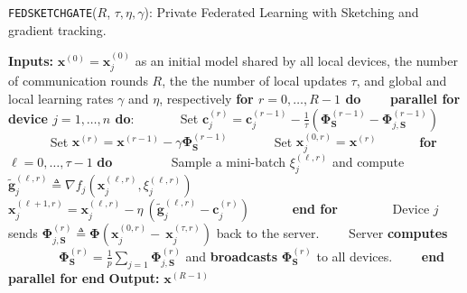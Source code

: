 \begin{algorithm}[H]
\caption{\texttt{FEDSKETCHGATE}($R$, $\tau, \eta, \gamma$): Private Federated Learning with Sketching and gradient tracking. }\label{Alg:PFLHet}
\begin{algorithmic}[1]
\State \textbf{Inputs:} $\boldsymbol{x}^{(0)}=\boldsymbol{x}^{(0)}_j$ as an initial  model shared by all local devices, the number of communication rounds $R$, the the number of local updates $\tau$, and global and local learning rates $\gamma$ and $\eta$, respectively
\State \textbf{for $r=0, \ldots, R-1$ do}
\State $\qquad$\textbf{parallel for device $j=1,\ldots,n$ do}:
\State $\qquad\quad$ Set $\mathbf{c}_j^{(r)}=\mathbf{c}_j^{(r-1)}-\frac{1}{\tau}\left(\mathbf{\Phi}_{\mathbf{S}}^{(r-1)}-\mathbf{\Phi}^{(r-1)}_{j,\mathbf{S}}\right)$
\State $\qquad\quad$ Set $\boldsymbol{x}^{(r)}=\boldsymbol{x}^{(r-1)}-\gamma{\mathbf{\Phi}}_{\mathbf{S}}^{(r-1)}$
\State $\qquad\quad$ Set $\boldsymbol{x}_j^{(0,r)}=\boldsymbol{x}^{(r)}$ %
\State $\qquad\quad $\textbf{for} $\ell=0,\ldots,\tau-1$ \textbf{do}
\State $\qquad\quad\quad$ Sample a mini-batch $\xi_j^{(\ell,r)}$ and compute $\tilde{\mathbf{g}}_{j}^{(\ell,r)}\triangleq\nabla{f}_j(\boldsymbol{x}^{(\ell,r)}_j,\xi_j^{(\ell,r)})$
\State $\qquad\quad\quad$ $\boldsymbol{x}^{(\ell+1,r)}_{j}=\boldsymbol{x}^{(\ell,r)}_j-\eta~\left( \tilde{\mathbf{g}}_{j}^{(\ell,r)}-\mathbf{c}_j^{(r)}\right)$ \label{eq:update-rule-alg}
\State $\qquad\quad$\textbf{end for}
\State $\qquad\quad\quad$Device $j$ sends $\mathbf{\Phi}^{(r)}_{j,\mathbf{S}}\triangleq\mathbf{\Phi}\left(\boldsymbol{x}_j^{(0,r)}-~{\boldsymbol{x}}_{j}^{(\tau,r)}\right)$ back to the server.
\State $\qquad$Server \textbf{computes} 
\State $\qquad\qquad {\mathbf{\Phi}}_{\mathbf{S}}^{(r)}=\frac{1}{p}\sum_{j=1}\mathbf{\Phi}^{(r)}_{j,\mathbf{S}}$ and  \textbf{broadcasts} ${\mathbf{\Phi}}_{\mathbf{S}}^{(r)}$ to all devices.
\State $\qquad$\textbf{end parallel for}
\State \textbf{end}
\State \textbf{Output:} ${\boldsymbol{x}}^{(R-1)}$
\vspace{- 0.1cm}
\end{algorithmic}
\end{algorithm}
